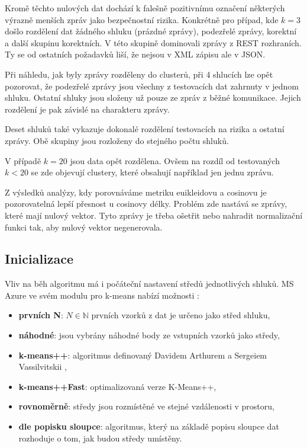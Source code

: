 \documentclass[thesis=M,czech]{FITthesis}[2012/10/20]
\begin{document}
			Kromě těchto nulových dat dochází k falešně pozitivnímu označení některých výrazně menších zpráv jako bezpečnostní rizika. Konkrétně pro případ, kde $k = 3$ došlo rozdělení dat žádného shluku (prázdné zprávy), podezřelé zprávy, korektní a další skupinu korektních. V této skupině dominovali zprávy z REST rozhraních. Ty se od ostatních požadavků liší, že nejsou v XML zápisu ale v JSON.
			
			Při náhledu, jak byly zprávy rozděleny do clusterů, při 4 shlucích lze opět pozorovat, že podezřelé zprávy jsou všechny z testovacích dat zahrnuty v jednom shluku. Ostatní shluky jsou složeny už pouze ze zpráv z běžné komunikace. Jejich rozdělení je pak závislé na charakteru zprávy.
			
			Deset shluků také vykazuje dokonalé rozdělení testovacích na rizika a ostatní zprávy. Obě skupiny jsou rozloženy do stejného počtu shluků.
			
			V případě $ k = 20$ jsou data opět rozdělena. Ovšem na rozdíl od testovaných $k < 20$ se zde objevují clustery, které obsahují například jen jednu zprávu. 
			
			Z výsledků analýzy, kdy porovnáváme metriku euikleidovu a cosinovu je pozorovatelná lepší přesnost u cosinovy délky. Problém zde nastává se zprávy, které mají nulový vektor. Tyto zprávy je třeba ošetřit nebo nahradit normalizační funkci tak, aby nulový vektor negenerovala. 			
			
		\subsection{Inicializace}
			Vliv na běh algoritmu má i počáteční nastavení středů jednotlivých shluků. MS Azure ve svém modulu pro k-means nabízí možnosti \cite{MSAzure-kmeans}:
			
			\begin{itemize} 
				\item \textbf{prvních N}: $N \in \mathbb{N} $ prvních vzorků z dat je určeno jako střed shluku, 
				\item \textbf{náhodné}: jsou vybrány náhodné body ze vstupních vzorků jako středy,
				\item \textbf{k-means++}: algoritmus definovaný Davidem Arthurem a Sergeiem Vassilvitskii \cite{kmeans++},
				\item \textbf{k-means++Fast}: optimalizovaná verze K-Means++,	
				\item \textbf{rovnoměrně}: středy jsou rozmístěné ve stejné vzdálenosti v prostoru,		
				\item \textbf{dle popisku sloupce}: algoritmus, který na základě popisu sloupce dat rozhoduje o tom, jak budou středy umístěny.			
			\end{itemize}
		
\end{document}
